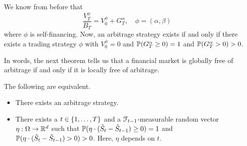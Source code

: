 \documentclass[12pt]{amsart}
\begin{document}
We know from before that \[
    \frac{V_T^\phi}{B_T} = V_0^\phi + G_T^\alpha, \quad \phi = (\alpha, \beta)
\]
where \(\phi\) is self-financing. Now, an arbitrage strategy exists if and only if there exists a trading strategy \(\phi\) with \(V_0^\phi = 0\) and \(\P(G_T^\alpha \geq 0) = 1\) and \(\P(G_T^\alpha > 0) > 0\).

In words, the next theorem tells us that a financial market is globally free of arbitrage if and only if it is locally free of arbitrage.

\begin{theorem}\label{th:ARB_STRAT_EQUIV}
    The following are equivalent.
    \begin{itemize}
        \item There exists an arbitrage strategy.
        \item There exists a \(t \in \set{1, \dots, T}\) and a \(\cF_{t-1}\)-measurable random vector \(\eta: \Omega \to \R^{d}\) such that \(\P(\eta \cdot (\tilde{S}_t - \tilde{S}_{t-1}) \geq 0) = 1\) and \(\P(\eta \cdot (\tilde{S}_t - \tilde{S}_{t-1}) > 0) > 0\). Here, \(\eta\) depends on \(t\).
    \end{itemize}
\end{theorem}
\end{document}
